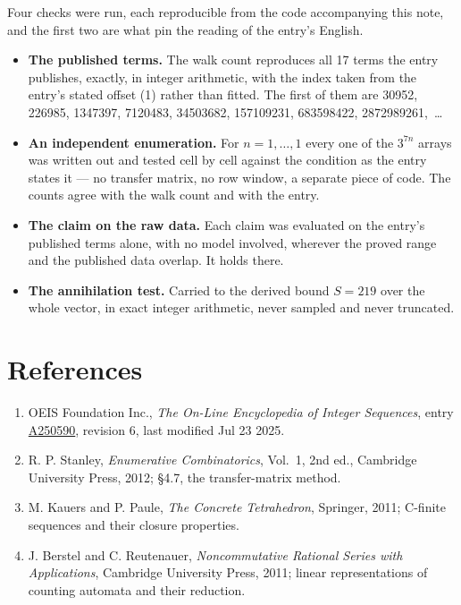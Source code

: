\documentclass[11pt]{article}
\theoremstyle{definition}
\begin{document}
Four checks were run, each reproducible from the code accompanying this note, and the first two are what pin the reading of the entry's English.

\begin{itemize}

\item {\bfseries The published terms.} The walk count reproduces all 17 terms the entry publishes, exactly, in integer arithmetic, with the index taken from the entry's stated offset (1) rather than fitted. The first of them are 30952, 226985, 1347397, 7120483, 34503682, 157109231, 683598422, 2872989261,~\dots

\item {\bfseries An independent enumeration.} For $n = 1,\dots,1$ every one of the $3^{7n}$ arrays was written out and tested cell by cell against the condition as the entry states it --- no transfer matrix, no row window, a separate piece of code. The counts agree with the walk count and with the entry.

\item {\bfseries The claim on the raw data.} Each claim was evaluated on the entry's published terms alone, with no model involved, wherever the proved range and the published data overlap. It holds there.

\item {\bfseries The annihilation test.} Carried to the derived bound $S = 219$ over the whole vector, in exact integer arithmetic, never sampled and never truncated.

\end{itemize}

\section{References}

\begin{enumerate}

\item OEIS Foundation Inc., \emph{The On-Line Encyclopedia of Integer Sequences}, entry \href{https://oeis.org/A250590}{A250590}, revision 6, last modified Jul 23 2025.

\item R. P. Stanley, \emph{Enumerative Combinatorics}, Vol.~1, 2nd ed., Cambridge University Press, 2012; \S4.7, the transfer-matrix method.

\item M. Kauers and P. Paule, \emph{The Concrete Tetrahedron}, Springer, 2011; C-finite sequences and their closure properties.

\item J. Berstel and C. Reutenauer, \emph{Noncommutative Rational Series with Applications}, Cambridge University Press, 2011; linear representations of counting automata and their reduction.

\end{enumerate}
\end{document}
